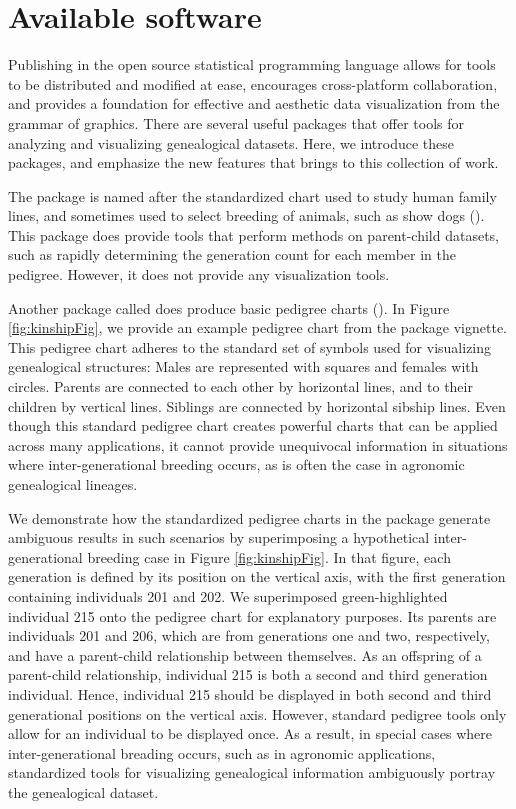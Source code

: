 \documentclass[article,shortnames]{jss}
\begin{document}
\section{Available software}

Publishing in the open source  statistical programming language allows for tools to be distributed and modified at ease, encourages cross-platform collaboration, and provides a foundation for effective and aesthetic data visualization from the grammar of graphics. There are several useful  packages that offer tools for analyzing and visualizing genealogical datasets. Here, we introduce these packages, and emphasize the new features that  brings to this collection of work.

The  package  is named after the standardized chart used to study human family lines, and sometimes used to select breeding of animals, such as show dogs (\citealt{ped}). This package does provide tools that perform methods on parent-child datasets, such as rapidly determining the generation count for each member in the pedigree. However, it does not provide any visualization tools.

Another  package called  does produce basic pedigree charts (\citealt{kin}). In Figure \ref{fig:kinshipFig}, we provide an example pedigree chart from the  package vignette. This pedigree chart adheres to the standard set of symbols used for visualizing genealogical structures: Males are represented with squares and females with circles. Parents are connected to each other by horizontal lines, and to their children by vertical lines. Siblings are connected by horizontal sibship lines. Even though this standard pedigree chart creates powerful charts that can be applied across many applications, it cannot provide unequivocal information in situations where inter-generational breeding occurs, as is often the case in agronomic genealogical lineages.

We demonstrate how the standardized pedigree charts in the  package generate ambiguous results in such scenarios by superimposing a hypothetical inter-generational breeding case in Figure \ref{fig:kinshipFig}. In that figure, each generation is defined by its position on the vertical axis, with the first generation containing individuals 201 and 202. We superimposed green-highlighted individual 215 onto the pedigree chart for explanatory purposes. Its parents are individuals 201 and 206, which are from generations one and two, respectively, and have a parent-child relationship between themselves. As an offspring of a parent-child relationship, individual 215 is both a second and third generation individual. Hence, individual 215 should be displayed in both second and third generational positions on the vertical axis. However, standard pedigree tools only allow for an individual to be displayed once. As a result, in special cases where inter-generational breading occurs, such as in agronomic applications, standardized tools for visualizing genealogical information ambiguously portray the genealogical dataset.
\end{document}
